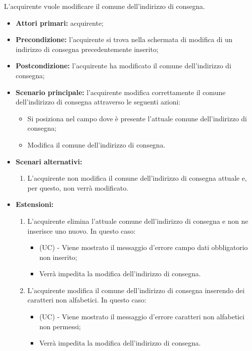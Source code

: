 L'acquirente vuole modificare il comune dell'indirizzo di consegna.
\begin{itemize}
    \item \textbf{Attori primari:} acquirente;
    \item \textbf{Precondizione:} l'acquirente si trova nella schermata di modifica di un indirizzo di consegna precedentemente inserito;
    \item \textbf{Postcondizione:} l'acquirente ha modificato il comune dell'indirizzo di consegna;
    \item \textbf{Scenario principale:} l'acquirente modifica correttamente il comune dell'indirizzo di consegna attraverso le seguenti azioni:
    \begin{itemize}
        \item Si posiziona nel campo dove è presente l'attuale comune dell'indirizzo di consegna;
        \item Modifica il comune dell'indirizzo di consegna.
    \end{itemize}
    \item \textbf{Scenari alternativi:}
    \begin{enumerate}[label=\lett]
        \item L'acquirente non modifica il comune dell'indirizzo di consegna attuale e, per questo, non verrà modificato.
    \end{enumerate}
    \item \textbf{Estensioni:}
    \begin{enumerate}[label=\lett]
        \item L'acquirente elimina l'attuale comune dell'indirizzo di consegna e non ne inserisce uno nuovo. In questo caso:
        \begin{itemize}
            \item (UC) - Viene mostrato il messaggio d'errore campo dati obbligatorio non inserito;
            \item Verrà impedita la modifica dell'indirizzo di consegna.
        \end{itemize}
        \item L'acquirente modifica il comune dell'indirizzo di consegna inserendo dei caratteri non alfabetici. In questo caso:
        \begin{itemize}
            \item (UC) - Viene mostrato il messaggio d'errore caratteri non alfabetici non permessi;
            \item Verrà impedita la modifica dell'indirizzo di consegna.
        \end{itemize}
    \end{enumerate}
\end{itemize}

